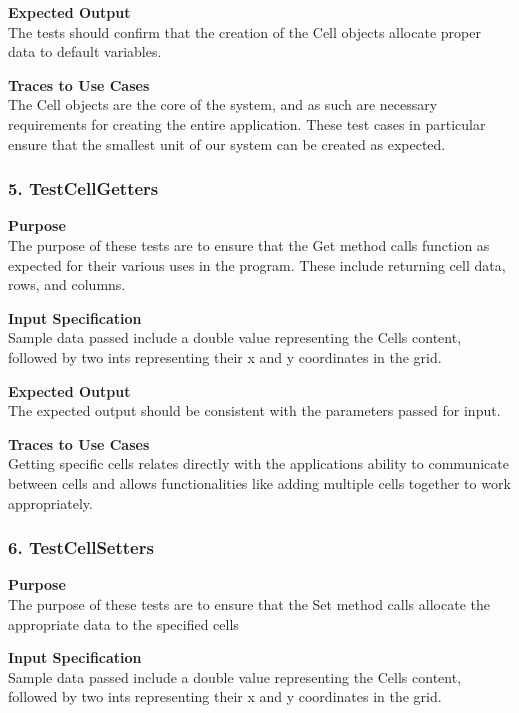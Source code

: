 \documentclass[12pt]{article}
\begin{document}
\noindent
{\bf Expected Output}\\
The tests should confirm that the creation of the Cell objects allocate proper data to default variables. 

\noindent
{\bf Traces to Use Cases}\\
The Cell objects are the core of the system, and as such are necessary requirements for creating the entire application. These test cases in particular ensure that the smallest unit of our system can be created as expected. 
\subsubsection{5. TestCellGetters} \label{tc:1}

\noindent
{\bf Purpose}\\
The purpose of these tests are to ensure that the Get method calls function as expected for their various uses in the program. These include returning cell data, rows, and columns.  

\noindent
{\bf Input Specification}\\
Sample data passed include a double value representing the Cells content, followed by two ints representing their x and y coordinates in the grid. 

\noindent
{\bf Expected Output}\\
The expected output should be consistent with the parameters passed for input. 

\noindent
{\bf Traces to Use Cases}\\
Getting specific cells relates directly with the applications ability to communicate between cells and allows functionalities like adding multiple cells together to work appropriately. 
\subsubsection{6. TestCellSetters} \label{tc:1}

\noindent
{\bf Purpose}\\
The purpose of these tests are to ensure that the Set method calls allocate the appropriate data to the specified cells

\noindent
{\bf Input Specification}\\
Sample data passed include a double value representing the Cells content, followed by two ints representing their x and y coordinates in the grid. 
\end{document}
